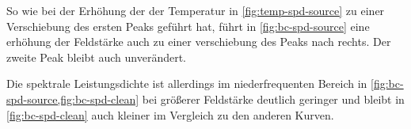 \documentclass[main.tex]{subfiles}
\begin{document}
So wie bei der Erhöhung der der Temperatur in \cref{fig:temp-spd-source} zu einer Verschiebung des ersten Peaks geführt hat, führt in  \cref{fig:bc-spd-source} eine erhöhung der Feldstärke auch zu einer verschiebung des Peaks nach rechts. Der zweite Peak bleibt auch unverändert.

Die spektrale Leistungsdichte ist allerdings im niederfrequenten Bereich in \cref{fig:bc-spd-source,fig:bc-spd-clean} bei größerer Feldstärke deutlich geringer und bleibt in \cref{fig:bc-spd-clean} auch kleiner im Vergleich zu den anderen Kurven.


\begin{figure}[H]
    \centering

\end{figure}
\end{document}
